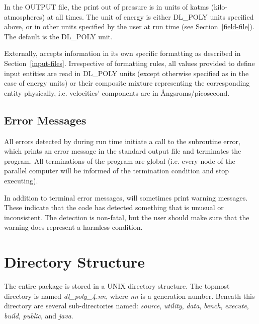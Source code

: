  In the \D OUTPUT file, the print out of
pressure is in units of katms
(kilo-atmospheres) at all times.  The unit of energy is either
DL\_POLY units specified above, or in other units specified by the
user at run time (see Section~\ref{field-file}).  The default is the
DL\_POLY unit.

Externally, \D accepts information in its own specific formatting
as described in Section~\ref{input-files}.  Irrespective of formatting
rules, all values provided to define input entities are read in
DL\_POLY units (except otherwise specified as in the case of energy
units) or their composite mixture representing the corresponding
entity physically, i.e. velocities' components are in \AA ngsroms/picosecond.

\subsection{Error Messages}

All errors detected by \D during run time initiate a call to the
subroutine {\sc error}, which prints an error message in the
standard output file and terminates the program.  All terminations
of the program are global (i.e. every node of the parallel
computer will be informed of the termination condition and stop
executing).

In addition to terminal error messages, \D will sometimes print
warning messages.  These indicate that the code has detected
something that is unusual or inconsistent.  The detection is
non-fatal, but the user should make sure that the warning does
represent a harmless condition.

\section{Directory Structure}
\label{directory-structure}

The entire \D package is stored in a UNIX directory structure. The
topmost directory is named {\em dl\_poly\_4.nn}, where {\em nn} is
a generation number.  Beneath this directory are several
sub-directories named: {\em source},
{\em utility},
{\em data},
{\em bench},
{\em execute},
{\em build},
{\em public}, and
{\em java}.

